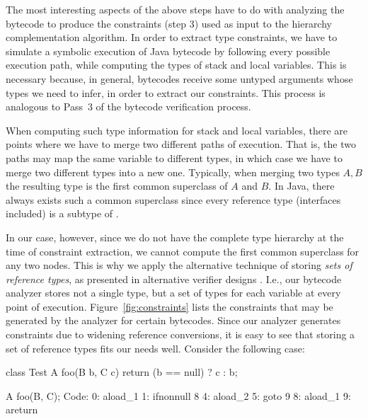 The most interesting aspects of the above steps have to do with
analyzing the bytecode to produce the constraints (step 3) used as
input to the hierarchy complementation algorithm. In order to extract
type constraints, we have to simulate a symbolic execution of Java
bytecode by following every possible execution path, while computing
the types of stack and local variables. This is necessary because, in
general, bytecodes receive some untyped arguments whose types we need
to infer, in order to extract our constraints. This process is
analogous to Pass~3
\cite[Section~4.9.2]{Lindholm:1999:JVM:553607} of the bytecode
verification process.

When computing such type information for stack and local variables,
there are points where we have to merge two different paths of
execution. That is, the two paths may map the same variable to
different types, in which case we have to merge two different types
into a new one. Typically, when merging two types $A,B$ the resulting
type is the first common superclass of $A$ and $B$. In Java, there
always exists such a common superclass since every reference type
(interfaces included) is a subtype of .

In our case, however, since we do not have the complete type hierarchy
at the time of constraint extraction, we cannot compute the first
common superclass for any two nodes. This is why we apply the
alternative technique of storing \emph{sets of reference types}, as
presented in alternative verifier
designs \cite{Stark00theproblem}. I.e., our bytecode analyzer stores
not a single type, but a set of types for each variable at every point
of execution. Figure~\ref{fig:constraints} lists the constraints that
may be generated by the analyzer for certain bytecodes. Since our
analyzer generates constraints due to widening reference conversions,
it is easy to see that storing a set of reference types fits our needs
well. Consider the following case:

\begin{multicols}{2}
\begin{javacode}
class Test {
   A foo(B b, C c) {
      return (b == null) ?
         c : b;
   }
}
\end{javacode}
\columnbreak
\begin{bytecode}
A foo(B, C);
  Code:
   0:       aload_1
   1:       ifnonnull 8
   4:       aload_2
   5:       goto 9
   8:       aload_1
   9:       areturn
\end{bytecode}
\end{multicols}


